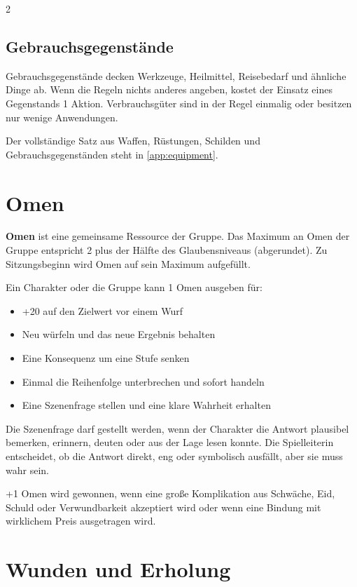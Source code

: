 \begin{multicols*}{2}
\subsection{Gebrauchsgegenstände}\label{sec:gebrauchsgegenstande}

Gebrauchsgegenstände decken Werkzeuge, Heilmittel, Reisebedarf und ähnliche Dinge ab.
Wenn die Regeln nichts anderes angeben, kostet der Einsatz eines Gegenstands 1 Aktion.
Verbrauchsgüter sind in der Regel einmalig oder besitzen nur wenige Anwendungen.

Der vollständige Satz aus Waffen, Rüstungen, Schilden und Gebrauchsgegenständen steht in \cref{app:equipment}.

\section{Omen}

\textbf{Omen} ist eine gemeinsame Ressource der Gruppe.
Das Maximum an Omen der Gruppe entspricht 2 plus der Hälfte des Glaubensniveaus (abgerundet).
Zu Sitzungsbeginn wird Omen auf sein Maximum aufgefüllt.

Ein Charakter oder die Gruppe kann 1 Omen ausgeben für:

\begin{itemize}[leftmargin=*]
\item +20 auf den Zielwert vor einem Wurf
\item Neu würfeln und das neue Ergebnis behalten
\item Eine Konsequenz um eine Stufe senken
\item Einmal die Reihenfolge unterbrechen und sofort handeln
\item Eine Szenenfrage stellen und eine klare Wahrheit erhalten
\end{itemize}

Die Szenenfrage darf gestellt werden, wenn der Charakter die Antwort plausibel bemerken, erinnern, deuten oder aus der Lage lesen konnte.
Die Spielleiterin entscheidet, ob die Antwort direkt, eng oder symbolisch ausfällt, aber sie muss wahr sein.

+1 Omen wird gewonnen, wenn eine große Komplikation aus Schwäche, Eid, Schuld oder Verwundbarkeit akzeptiert wird oder wenn eine Bindung mit wirklichem Preis ausgetragen wird.

\section{Wunden und Erholung}

\end{multicols*}
